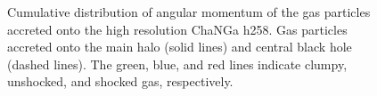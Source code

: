 \documentclass[manuscript]{aastex}
\begin{document}
\begin{figure}
\centerline{}
\caption[]{ Cumulative distribution of angular momentum of the gas particles accreted onto the high resolution ChaNGa h258.  Gas particles accreted onto the main halo (solid lines) and central black hole (dashed lines). The green, blue, and red lines indicate clumpy, unshocked, and shocked gas, respectively.}
\label{hrh258angmom} 
\end{figure}
\end{document}
